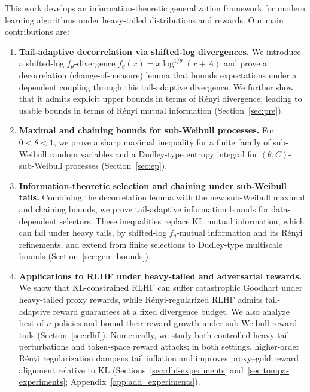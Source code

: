 \documentclass[11pt]{article}
\begin{document}
This work develops an information-theoretic generalization framework for
modern learning algorithms under heavy-tailed distributions and rewards. Our main contributions are:
\begin{enumerate}
\item \textbf{Tail-adaptive decorrelation via shifted-log divergences.}
We introduce a shifted-log $f_\theta$-divergence
$f_\theta(x)=x\log^{1/\theta}(x+A)$ and prove a decorrelation (change-of-measure)
lemma that bounds expectations under a dependent coupling through this
tail-adaptive divergence. We further show that it admits explicit upper bounds
in terms of R\'enyi divergence, leading to usable bounds in terms of R\'enyi
mutual information (Section~\ref{sec:pre}).

\item \textbf{Maximal and chaining bounds for sub-Weibull processes.}
For $0<\theta<1$, we prove a sharp maximal inequality for a finite family of
sub-Weibull random variables and a Dudley-type entropy integral for
$(\theta,C)$-sub-Weibull processes (Section~\ref{sec:ep}).

\item \textbf{Information-theoretic selection and chaining under sub-Weibull tails.}
Combining the decorrelation lemma with the new sub-Weibull maximal and chaining
bounds, we prove tail-adaptive information bounds for data-dependent selectors.
These inequalities replace KL mutual information, which can fail under heavy
tails, by shifted-log $f_\theta$-mutual information and its R\'enyi refinements,
and extend from finite selections to Dudley-type multiscale bounds
(Section~\ref{sec:gen_bounds}).

\item \textbf{Applications to RLHF under heavy-tailed and adversarial rewards.}
We show that KL-constrained RLHF can suffer catastrophic Goodhart under
heavy-tailed proxy rewards, while R\'enyi-regularized RLHF admits tail-adaptive
reward guarantees at a fixed divergence budget. We also analyze best-of-$n$
policies and bound their reward growth under sub-Weibull reward tails
(Section~\ref{sec:rlhf}). Numerically, we study both controlled heavy-tail
perturbations and token-space reward attacks; in both settings, higher-order
R\'enyi regularization dampens tail inflation and improves proxy--gold reward
alignment relative to KL (Sections~\ref{sec:rlhf-experiments}
and~\ref{sec:tompa-experiments}; Appendix~\ref{app:add_experiments}).

\end{enumerate}
\end{document}
